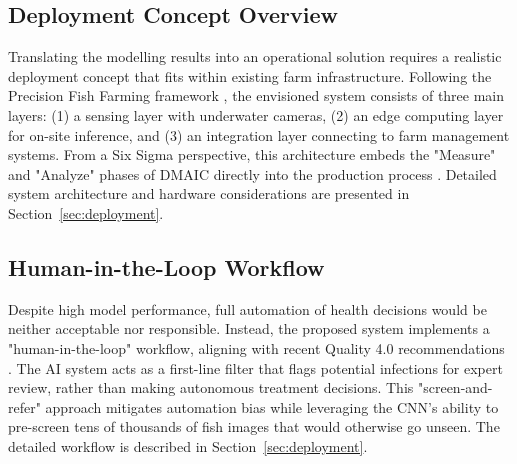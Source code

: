 \documentclass[12pt,a4paper]{article}
\begin{document}
\subsection{Deployment Concept Overview}
Translating the modelling results into an operational solution requires a realistic deployment concept that fits within existing farm infrastructure. Following the Precision Fish Farming framework \citep{FORE2018176}, the envisioned system consists of three main layers: (1) a sensing layer with underwater cameras, (2) an edge computing layer for on-site inference, and (3) an integration layer connecting to farm management systems. From a Six Sigma perspective, this architecture embeds the "Measure" and "Analyze" phases of DMAIC directly into the production process \citep{Tsung2023, montgomery2020introduction}. Detailed system architecture and hardware considerations are presented in Section~\ref{sec:deployment}.

\subsection{Human-in-the-Loop Workflow}
Despite high model performance, full automation of health decisions would be neither acceptable nor responsible. Instead, the proposed system implements a "human-in-the-loop" workflow, aligning with recent Quality 4.0 recommendations \citep{10.1108/TQM-11-2023-0361}. The AI system acts as a first-line filter that flags potential infections for expert review, rather than making autonomous treatment decisions. This "screen-and-refer" approach mitigates automation bias while leveraging the CNN's ability to pre-screen tens of thousands of fish images that would otherwise go unseen. The detailed workflow is described in Section~\ref{sec:deployment}.
\end{document}
